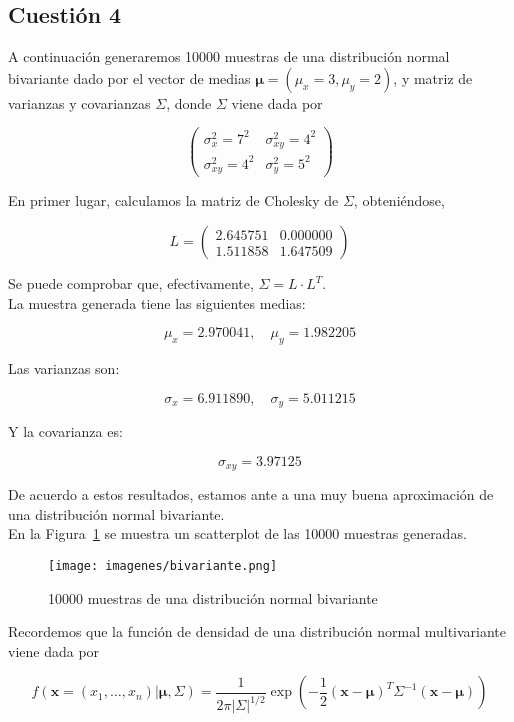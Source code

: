 \documentclass[12pt,a4paper,twoside,openright,titlepage,final]{article}
\begin{document}
\subsection{Cuestión 4}

A continuación generaremos 10000 muestras de una distribución normal bivariante dado por el vector de medias $\mathbf{\mu} = (\mu_x = 3, \mu_y = 2)$, y matriz de varianzas y covarianzas $\Sigma$, donde $\Sigma$ viene dada por

\[ \left( \begin{array}{cc}
\sigma^2_x = 7^2 & \sigma_{xy}^2 = 4^2\\
\sigma_{xy}^2 = 4^2 & \sigma_y^2 = 5^2
\end{array} \right) \]

En primer lugar, calculamos la matriz de Cholesky de $\Sigma$, obteniéndose,

\[ L = \left( \begin{array}{cc}
2.645751 & 0.000000 \\
1.511858 & 1.647509
\end{array} \right) \]

Se puede comprobar que, efectivamente, $\Sigma = L \cdot L^T$.\\

La muestra generada tiene las siguientes medias:

\[\mu_x = 2.970041, \quad \mu_y = 1.982205\]

Las varianzas son:

\[\sigma_x = 6.911890, \quad \sigma_y = 5.011215 \]

Y la covarianza es:

\[ \sigma_{xy} = 3.97125 \]

De acuerdo a estos resultados, estamos ante a una muy buena aproximación de una distribución normal bivariante.\\

En la Figura~\ref{fig:bivariante} se muestra un scatterplot de las 10000 muestras generadas.\\

\begin{figure}[tbph!]
\centering
\texttt{[image: imagenes/bivariante.png]}
\caption{10000 muestras de una distribución normal bivariante}
\label{fig:bivariante}
\end{figure}

Recordemos que la función de densidad de una distribución normal multivariante viene dada por

\[ f(\mathbf{x} = (x_1,\dots, x_n) | \mathbf{\mu}, \Sigma) = \dfrac{1}{2\pi |\Sigma|^{1/2}} \exp \left( -\dfrac{1}{2} (\mathbf{x} - \mathbf{\mu})^T \Sigma^{-1} (\mathbf{x} - \mathbf{\mu}) \right) \] 
\end{document}
